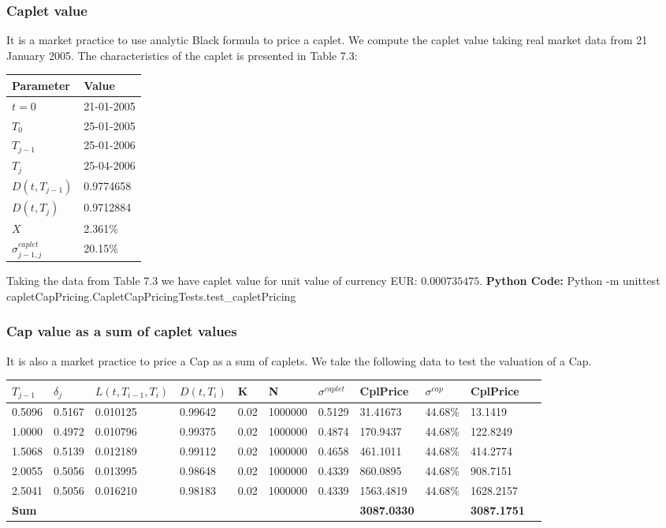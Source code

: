 \documentclass[11pt]{article}
\numberwithin{equation}{subsection}
\begin{document}
\subsubsection{Caplet value}
It is a market practice to use analytic Black formula to price a caplet. We compute the caplet value taking real market data from 21 January 2005. The characteristics of the caplet is presented in Table 7.3:

\vskip 0.2cm 		
{
\begin{center}
		\begin{tabular}{ll}
		\hline
		Parameter          & Value \\
		\hline
		\(t=0\)            &  21-01-2005 \\
		\(T_0\)            &  25-01-2005 \\
		\(T_{j−1}\)        & 25-01-2006 \\
		\(T_j\)            &  25-04-2006 \\
		\(D(t, T_{j-1})\)  &  0.9774658 \\
		\(D(t, T_{j})\)    &  0.9712884 \\
		\(X\)  			   & 2.361\%  \\
		\(\sigma^{caplet}_{j-1, j}\) & 20.15\% \\
		\hline				 				
	\end{tabular}
\end{center}
}
\vskip 0.4cm

Taking the data from Table 7.3 we have caplet value for unit value of currency EUR: \(0.000735475\).
\textbf{Python Code:} Python -m unittest capletCapPricing.CapletCapPricingTests.test\_capletPricing
\subsubsection{Cap value as a sum of caplet values}
It is also a market practice to price a Cap as a sum of caplets. We take the following data to test the valuation of a Cap.

\vskip 0.2cm 		
{
	\centering
	\begin{tabular}{lllllllllll}
		\hline
		\(T_{j-1}\) & \(\delta_{j}\) & \(L(t, T_{i-1}, T_i)\) & \(D(t, T_i)\) & K & N & \(\sigma^{caplet}\) & CplPrice & \( \sigma^{cap} \) & CplPrice  \\		
		\hline
		0.5096 & 0.5167 & 0.010125 & 0.99642 & 0.02 & 1000000 & 0.5129 & 31.41673 & 44.68\% & 13.1419 \\
		1.0000 & 0.4972 & 0.010796 & 0.99375 & 0.02 & 1000000 & 0.4874 & 170.9437 & 44.68\% & 122.8249 \\	
		1.5068 & 0.5139 & 0.012189 & 0.99112 & 0.02 & 1000000 & 0.4658 & 461.1011 & 44.68\% & 414.2774 \\	
		2.0055 & 0.5056 & 0.013995 & 0.98648 & 0.02 & 1000000 & 0.4339 & 860.0895 & 44.68\% & 908.7151 \\	
		2.5041 & 0.5056 & 0.016210 & 0.98183 & 0.02 & 1000000 & 0.4339 & 1563.4819& 44.68\% & 1628.2157 \\	
		\hline				 				
		\textbf{Sum} &  &  &  &  &  &  & \textbf{3087.0330} & & \textbf{3087.1751} \\	
		\hline				 				
	\end{tabular}
}
\vskip 0.4cm
\end{document}
